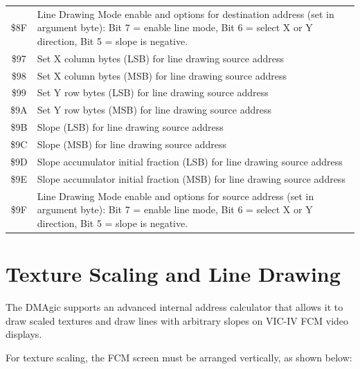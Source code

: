 \begin{tabular}{|c|p{10cm}|}
  \$8F & Line Drawing Mode enable and options for destination address (set in argument byte): Bit 7 = enable line mode, Bit 6 = select X or Y direction, Bit 5 = slope is negative. \\
  \$97 & Set X column bytes (LSB) for line drawing source address \\
  \$98 & Set X column bytes (MSB) for line drawing source address \\
  \$99 & Set Y row bytes (LSB) for line drawing source address \\
  \$9A & Set Y row bytes (MSB) for line drawing source address \\
  \$9B & Slope (LSB) for line drawing source address \\
  \$9C & Slope (MSB) for line drawing source address \\
  \$9D & Slope accumulator initial fraction (LSB) for line drawing source address \\
  \$9E & Slope accumulator initial fraction (MSB) for line drawing source address \\
  \$9F & Line Drawing Mode enable and options for source address (set in argument byte): Bit 7 = enable line mode, Bit 6 = select X or Y direction, Bit 5 = slope is negative. \\
  
  \hline
\end{tabular}

\section{Texture Scaling and Line Drawing}

The DMAgic supports an advanced internal address calculator that allows it to draw scaled textures and draw
lines with arbitrary slopes on VIC-IV FCM video displays.

For texture scaling, the FCM screen must be arranged
vertically, as shown below:

